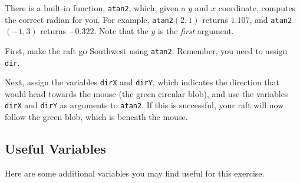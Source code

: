 \documentclass[titlepage]{article}
\newcommand{\drawbox}[1]{\noindent\shadowbox{\parbox{\linewidth-8pt}{\vspace{#1em}~}}\newline}
\begin{document}
\begin{center}
\end{center}

There is a built-in function, \verb|atan2|, which, given a $y$ and $x$ coordinate,
computes the correct radian for you. For example, \verb|atan2|$(2,1)$ returns $1.107$,
and \verb|atan2|$(-1,3)$ returns $-0.322$. Note that the $y$ is the {\em first\/} argument.

First, make the raft go Southwest using \verb|atan2|. Remember, you need to assign \verb|dir|.

\drawbox{4}

Next, assign the variables \verb|dirX| and \verb|dirY|, which indicates the direction
that would head towards the mouse (the green circular blob), and use the
variables \verb|dirX| and \verb|dirY| as arguments to \verb|atan2|. 
If this is successful, your raft will now follow the green blob, which is beneath
the mouse.

\drawbox{10}

\subsection*{Useful Variables}

Here are some additional variables you may find useful for this exercise.
\end{document}
